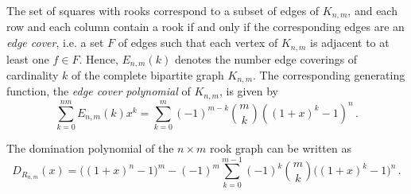 \documentclass[12pt,reqno]{article}
\begin{document}
The set of squares with rooks correspond to a subset of edges of
$K_{n,m}$, and each row and each column contain a rook if and only if
the corresponding edges are an \emph{edge cover}, i.e. a set $F$ of edges
such that each vertex of $K_{n,m}$ is adjacent to at least one $f\in
F$. Hence, $E_{n,m}(k)$ denotes the number edge coverings of
cardinality $k$ of the complete bipartite graph $K_{n,m}$. 
The corresponding generating function, the  \emph{edge cover polynomial} 
of $K_{n,m}$, is given by \cite[Corollary 5]{akbari:oboudi:13}
\begin{equation}
  \label{eq:bipartite-edge-coverings}
  \sum_{k=0}^{nm} E_{n,m}(k) x^k = \sum_{k=0}^m(-1)^{m-k}{m \choose k}((1+x)^k-1)^n\,.
\end{equation}

\begin{theorem} \label{thm:domination-polynomial}
  The domination polynomial of the $n\times m$ rook graph can be
  written as
  \begin{equation}
    \label{eq:domination-polynomial}
   D_{R_{n,m}}(x) = \big((1+x)^n-1\big)^m  - (-1)^m \sum_{k=0}^{m-1}
     (-1)^{k}{m \choose k}\big((1+x)^k-1\big)^{n}\,.
  \end{equation}
\end{theorem}
\end{document}
